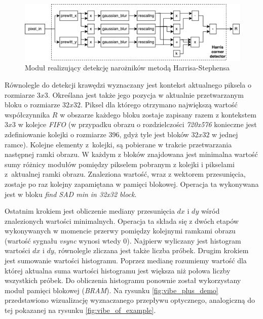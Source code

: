 	\begin{figure}[h!]
		\centering
		\includegraphics[scale=0.6]{img/4/harris_detector.pdf}
		\caption{Moduł realizujący detekcję narożników metodą Harrisa-Stephensa}
		\label{fig:harris_diagram}
	\end{figure}

Równolegle do detekcji krawędzi wyznaczany jest kontekst aktualnego piksela o rozmiarze $3x3$. 
Określana jest także jego pozycja w aktualnie przetwarzanym bloku o rozmiarze $32x32$. 
Piksel dla którego otrzymano największą wartość współczynnika $R$ w obszarze każdego bloku zostaje zapisany razem z kontekstem $3x3$ w kolejce \textit{FIFO} (w przypadku obrazu o rozdzielczości \textit{720x576} konieczne jest zdefiniowanie kolejki o rozmiarze 396, gdyż tyle jest bloków $32x32$ w jednej ramce). %
Kolejne elementy z~kolejki, są pobierane w trakcie przetwarzania następnej ramki obrazu. 
W każdym z bloków znajdowana jest minimalna wartość sumy różnicy modułów pomiędzy pikselem pobranym z kolejki i pikselami z~aktualnej ramki obrazu. Znaleziona wartość, wraz z wektorem przesunięcia, zostaje po raz kolejny zapamiętana w pamięci blokowej. Operacja ta wykonywana jest w bloku \textit{find SAD min in 32x32 block}.

Ostatnim krokiem jest obliczenie mediany przesunięcia $dx$ i $dy$ wśród znalezionych wartości minimalnych. 
Operacja ta składa się z dwóch etapów wykonywanych w momencie przerwy pomiędzy kolejnymi ramkami obrazu (wartość sygnału \textit{vsync} wynosi wtedy $0$). 
Najpierw wyliczany jest histogram wartości $dx$ i $dy$, równolegle zliczana jest także liczba próbek. 
Drugim krokiem jest sumowanie wartości histogramu. 
Poprzez medianę rozumiemy wartość dla której aktualna suma wartości histogramu jest większa niż połowa liczby wszystkich próbek. 
Do obliczenia histogramu ponownie został wykorzystany moduł pamięci blokowej (\textit{BRAM}). 
Na rysunku \ref{fig:vibe_plus_demo} przedstawiono wizualizację wyznaczanego przepływu optycznego, analogiczną do tej pokazanej na rysunku \ref{fig:vibe_of_example}.

